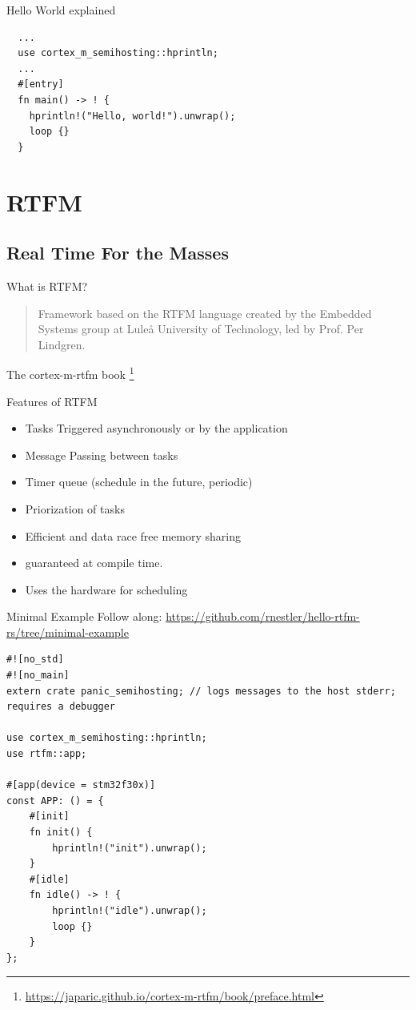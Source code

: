 \documentclass[aspectratio=1610,14pt,t]{beamer}
\begin{document}
\begin{frame}[c,fragile]{Hello World explained}
  \begin{verbatim}
  ...
  use cortex_m_semihosting::hprintln;
  ...
  #[entry]
  fn main() -> ! {
    hprintln!("Hello, world!").unwrap();
    loop {}
  }
  \end{verbatim}
\end{frame}

\section{RTFM}
\subsection{Real Time For the Masses}

\begin{frame}[c]{What is RTFM?}
  \begin{quote}
    Framework based on the RTFM language created by the Embedded Systems group
    at Luleå University of Technology, led by Prof. Per Lindgren.
  \end{quote}
  The cortex-m-rtfm book \footnote{\url{https://japaric.github.io/cortex-m-rtfm/book/preface.html}}
\end{frame}

\begin{frame}[c]{Features of RTFM}
  \begin{itemize}
      \item Tasks Triggered asynchronously or by the application
      \item Message Passing between tasks
      \item Timer queue (schedule in the future, periodic)
      \item Priorization of tasks
      \item Efficient and data race free memory sharing
      \item {} guaranteed at compile time.
      \item Uses the hardware for scheduling
  \end{itemize}
\end{frame}

\begin{frame}[c,fragile]{Minimal Example}
  \small{Follow along: \url{https://github.com/rnestler/hello-rtfm-rs/tree/minimal-example}}
  \begin{verbatim}
#![no_std]
#![no_main]
extern crate panic_semihosting; // logs messages to the host stderr; requires a debugger

use cortex_m_semihosting::hprintln;
use rtfm::app;

#[app(device = stm32f30x)]
const APP: () = {
    #[init]
    fn init() {
        hprintln!("init").unwrap();
    }
    #[idle]
    fn idle() -> ! {
        hprintln!("idle").unwrap();
        loop {}
    }
};
  \end{verbatim}
\end{frame}
\end{document}
